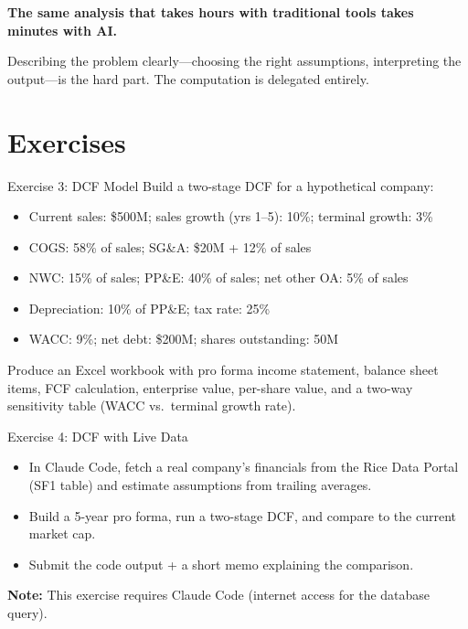 \documentclass[aspectratio=169]{beamer}
\begin{document}
\begin{frame}{}
\vspace{2cm}
\begin{center}
{\Large\bfseries The same analysis that takes hours with traditional tools takes minutes with AI.}

\vspace{1cm}
Describing the problem clearly---choosing the right assumptions, interpreting the output---is the hard part.  The computation is delegated entirely.
\end{center}
\end{frame}

\section{Exercises}

\begin{frame}{Exercise 3: DCF Model}
Build a two-stage DCF for a hypothetical company:
\vspace{0.2cm}
\begin{itemize}\small
  \item Current sales: \$500M; sales growth (yrs 1--5): 10\%; terminal growth: 3\%
  \item COGS: 58\% of sales; SG\&A: \$20M + 12\% of sales
  \item NWC: 15\% of sales; PP\&E: 40\% of sales; net other OA: 5\% of sales
  \item Depreciation: 10\% of PP\&E; tax rate: 25\%
  \item WACC: 9\%; net debt: \$200M; shares outstanding: 50M
\end{itemize}
\vspace{0.2cm}
Produce an Excel workbook with pro forma income statement, balance sheet items, FCF calculation, enterprise value, per-share value, and a two-way sensitivity table (WACC vs.\ terminal growth rate).
\end{frame}

\begin{frame}{Exercise 4: DCF with Live Data}
\begin{itemize}
  \item In Claude Code, fetch a real company's financials from the Rice Data Portal (SF1 table) and estimate assumptions from trailing averages.
  \item Build a 5-year pro forma, run a two-stage DCF, and compare to the current market cap.
  \item Submit the code output + a short memo explaining the comparison.
\end{itemize}

\vspace{0.3cm}
\textbf{Note:} This exercise requires Claude Code (internet access for the database query).
\end{frame}
\end{document}
